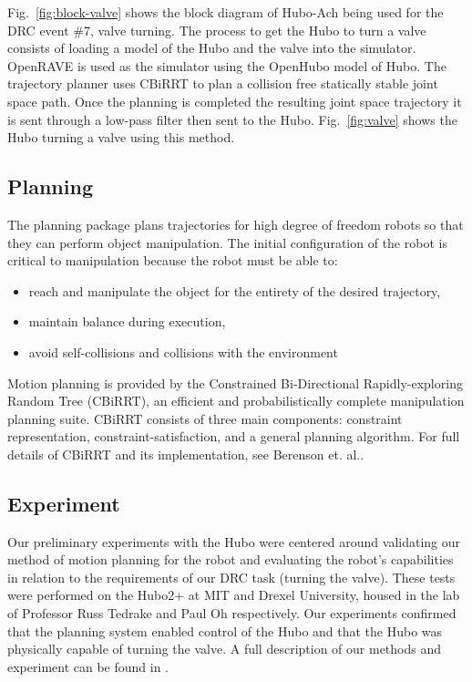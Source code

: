 Fig.~\ref{fig:block-valve} shows the block diagram of Hubo-Ach being used for the DRC event \#7, valve turning.  
The process to get the Hubo to turn a valve consists of loading a model of the Hubo and the valve into the simulator.  
OpenRAVE is used as the simulator using the OpenHubo model of Hubo.  
The trajectory planner uses CBiRRT to plan a collision free statically stable joint space path.  
Once the planning is completed the resulting joint space trajectory it is sent through a low-pass filter then sent to the Hubo.
Fig.~\ref{fig:valve} shows the Hubo turning a valve using this method.








\subsection{Planning}
The planning package plans trajectories for high degree of freedom robots so that they can perform object manipulation.
The initial configuration of the robot is critical to manipulation because the robot must be able to:
\begin{itemize}
\item reach and manipulate the object for the entirety of the desired trajectory,
\item maintain balance during execution,
\item avoid self-collisions and collisions with the environment
\end{itemize}
Motion planning is provided by the Constrained Bi-Directional Rapidly-exploring Random Tree (CBiRRT), an efficient and probabilistically complete manipulation planning suite. 
CBiRRT consists of three main components: constraint
representation, constraint-satisfaction, and a general planning algorithm. 
For full details of CBiRRT and its implementation, see Berenson et. al.\cite{Berenson_2011_6867}.

\subsection{Experiment}
Our preliminary experiments with the Hubo were centered around validating our method of motion planning for the robot and evaluating the robot’s capabilities in relation to the requirements of our DRC task (turning the valve). 
These tests were performed on the Hubo2+ at MIT and Drexel University, housed in the lab of Professor Russ Tedrake and Paul Oh respectively.
Our experiments conﬁrmed that the planning system enabled control of the Hubo and that the Hubo was physically capable of turning the valve.
A full description of our methods and experiment can be found in \cite{lofaroTePRA2013Valve}.









